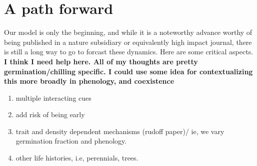 \documentclass{article}[12pt]
\begin{document}





\section{A path forward}

Our model is only the beginning, and while it is a noteworthy advance worthy of being published in a nature subsidiary or equivalently high impact journal, there is still a long way to go to forcast these dynamics. Here are some critical aspects.
\textbf{I think I need help here. All of my thoughts are pretty germination/chilling specific. I could use some idea for contextualizing this more broadly in phenology, and coexistence}
\begin{enumerate}
\item multiple interacting cues
\item add risk of being early
\item trait and density dependent mechanisms (rudoff paper)/ ie, we vary germination fraction and phenology.
\item other life histories, i.e, perennials, trees.

\end{enumerate}
\end{document}

